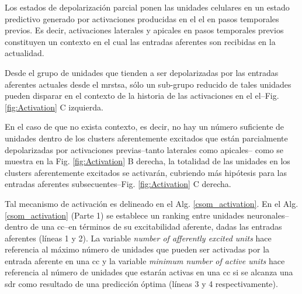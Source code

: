 Los estados de depolarización parcial ponen las unidades celulares en un estado predictivo generado por activaciones producidas en el \gls{el} en pasos temporales previos. Es decir, activaciones laterales y apicales en pasos temporales previos constituyen un contexto en el cual las entradas aferentes son recibidas en la actualidad.


Desde el grupo de unidades que tienden a ser depolarizadas por las entradas aferentes actuales desde el \gls{mrstsa}, sólo un sub-grupo reducido de tales unidades pueden disparar en el contexto de la historia de las activaciones en el \gls{el}--Fig. \ref{fig:Activation} C izquierda.


En el caso de que no exista contexto, es decir, no hay un número suficiente de unidades dentro de los clusters aferentemente excitados que están parcialmente depolarizadas por activaciones previas--tanto laterales como apicales-- como se muestra en la Fig. \ref{fig:Activation} B derecha, la totalidad de las unidades en los clusters aferentemente excitados se activarán, cubriendo más hipótesis para las entradas aferentes subsecuentes--Fig. \ref{fig:Activation} C derecha.


Tal mecanismo de activación es delineado en el Alg. \ref{csom_activation}. En el Alg. \ref{csom_activation} (Parte 1) se establece un ranking entre unidades neuronales--dentro de una \gls{cc}--en términos de su excitabilidad aferente, dadas las entradas aferentes (líneas 1 y 2). La variable \emph{number of afferently excited units} hace referencia al máximo número de unidades que pueden ser activadas por la entrada aferente en una \gls{cc} y la variable \emph{minimum number of active units} hace referencia al número de unidades que estarán activas en una \gls{cc} si se alcanza una \gls{sdr} como resultado de una predicción óptima (líneas 3 y 4 respectivamente).

